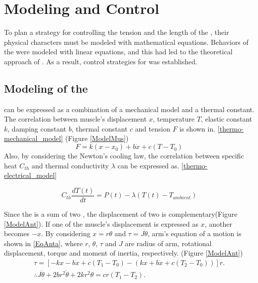 \section{Modeling and Control}\label{section_modelcontrol}

To plan a strategy for controlling the tension and the length of the \scpsnospace, their physical characters must be modeled with mathematical equations. 
Behaviors of the \scps were modeled with linear equations, and this had led to the theoretical approach of \antanospace.
As a result, control strategies for \apc was established.

\subsection{Modeling of the \ANTA}\label{section_thermo_model}
\scp can be expressed as a combination of a mechanical model and a thermal constant. The correlation between muscle's displacement $x$, temperature $T$, elastic constant $k$, damping constant $b$, thermal constant $c$ and tension $F$ is shown in. \eqref{thermo-mechanical_model} \cite{yip}
(Figure \ref{ModelMus})
\begin{equation} \label{thermo-mechanical_model}
F=k(x-x_0) + b\dot{x}+c(T-T_0)
\end{equation}
Also, by considering the Newton's cooling law, the correlation between specific heat $C_{th}$ and thermal conductivity $\lambda$ can be expressed as. \eqref{thermo-electrical_model} \cite{yip}

\begin{equation} \label{thermo-electrical_model}
C_{th}\frac{dT(t)}{dt} = P(t) - \lambda(T(t)-T_{ambient})
\end{equation}

Since the \anta is a sum of two \scpsnospace, the displacement of two \scps is complementary(Figure \ref{ModelAnt}). If one of the muscle's displacement is expressed as $x$, another becomes $-x$. By considering $x=r\theta$ and $\tau=J\ddot{\theta}$, arm's equation of a motion is shown in \eqref{EqAnta}, where $r$, $\theta$, $\tau$ and $J$ are radius of arm, rotational displacement, torque and moment of inertia, respectively.
(Figure \ref{ModelAnt})
\begin{gather}
\tau = [-kx-b\dot{x}+c(T_1-T_0) - (kx+b\dot{x}+c(T_2-T_0))]r. \nonumber \\
\therefore J\ddot{\theta}+2br^2\dot{\theta}+2kr^2\theta = cr(T_1-T_2). \label{EqAnta}
\end{gather}

